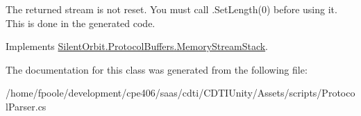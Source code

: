 The returned stream is not reset. You must call .Set\+Length(0) before using it. This is done in the generated code. 



Implements \hyperlink{interface_silent_orbit_1_1_protocol_buffers_1_1_memory_stream_stack}{Silent\+Orbit.\+Protocol\+Buffers.\+Memory\+Stream\+Stack}.



The documentation for this class was generated from the following file\+:\begin{DoxyCompactItemize}
\item 
/home/fpoole/development/cpe406/saas/cdti/\+C\+D\+T\+I\+Unity/\+Assets/scripts/Protocol\+Parser.\+cs\end{DoxyCompactItemize}
